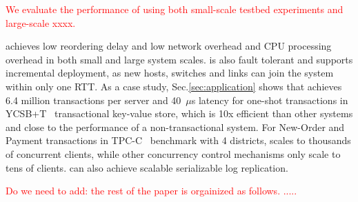 
\textcolor{red}{We evaluate the performance of \sys using both small-scale testbed experiments and large-scale xxxx.}

\sys achieves low reordering delay and low network overhead and CPU processing overhead in both small and large system scales. \sys is also fault tolerant and supports incremental deployment, as new hosts, switches and links can join the system within only one RTT. As a case study, Sec.\ref{sec:application} shows that \sys achieves 6.4 million transactions per server and 40~$\mu$s latency for one-shot transactions in YCSB+T~\cite{dey2014ycsbt} transactional key-value store, which is 10x efficient than other systems and close to the performance of a non-transactional system. For New-Order and Payment transactions in TPC-C~\cite{tpcc} benchmark with 4 districts, \sys scales to thousands of concurrent clients, while other concurrency control mechanisms only scale to tens of clients. \sys can also achieve scalable serializable log replication.

\textcolor{red}{Do we need to add: the rest of the paper is orgainized as follows. .....}
